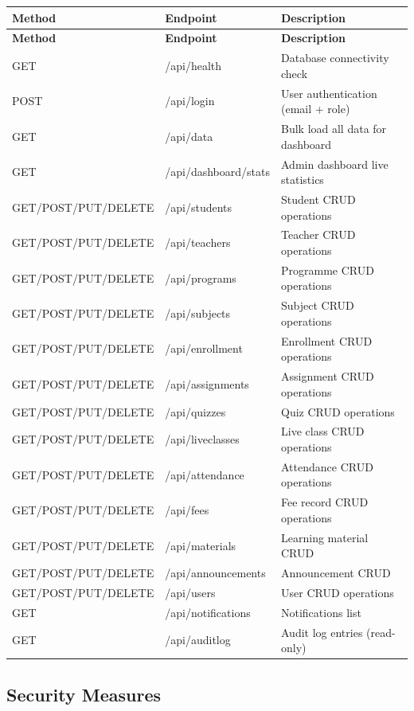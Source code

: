 \documentclass[12pt,a4paper]{report}
\begin{document}
\begin{longtable}{|L{4.5cm}|L{4.5cm}|L{5cm}|}
\hline
\textbf{Method} & \textbf{Endpoint} & \textbf{Description} \\
\hline
\endfirsthead
\hline
\textbf{Method} & \textbf{Endpoint} & \textbf{Description} \\
\hline
\endhead
GET & /api/health & Database connectivity check \\
\hline
POST & /api/login & User authentication (email + role) \\
\hline
GET & /api/data & Bulk load all data for dashboard \\
\hline
GET & /api/dashboard/stats & Admin dashboard live statistics \\
\hline
GET/POST/PUT/DELETE & /api/students & Student CRUD operations \\
\hline
GET/POST/PUT/DELETE & /api/teachers & Teacher CRUD operations \\
\hline
GET/POST/PUT/DELETE & /api/programs & Programme CRUD operations \\
\hline
GET/POST/PUT/DELETE & /api/subjects & Subject CRUD operations \\
\hline
GET/POST/PUT/DELETE & /api/enrollment & Enrollment CRUD operations \\
\hline
GET/POST/PUT/DELETE & /api/assignments & Assignment CRUD operations \\
\hline
GET/POST/PUT/DELETE & /api/quizzes & Quiz CRUD operations \\
\hline
GET/POST/PUT/DELETE & /api/liveclasses & Live class CRUD operations \\
\hline
GET/POST/PUT/DELETE & /api/attendance & Attendance CRUD operations \\
\hline
GET/POST/PUT/DELETE & /api/fees & Fee record CRUD operations \\
\hline
GET/POST/PUT/DELETE & /api/materials & Learning material CRUD \\
\hline
GET/POST/PUT/DELETE & /api/announcements & Announcement CRUD \\
\hline
GET/POST/PUT/DELETE & /api/users & User CRUD operations \\
\hline
GET & /api/notifications & Notifications list \\
\hline
GET & /api/auditlog & Audit log entries (read-only) \\
\hline
\end{longtable}

\subsection{Security Measures}
\end{document}
